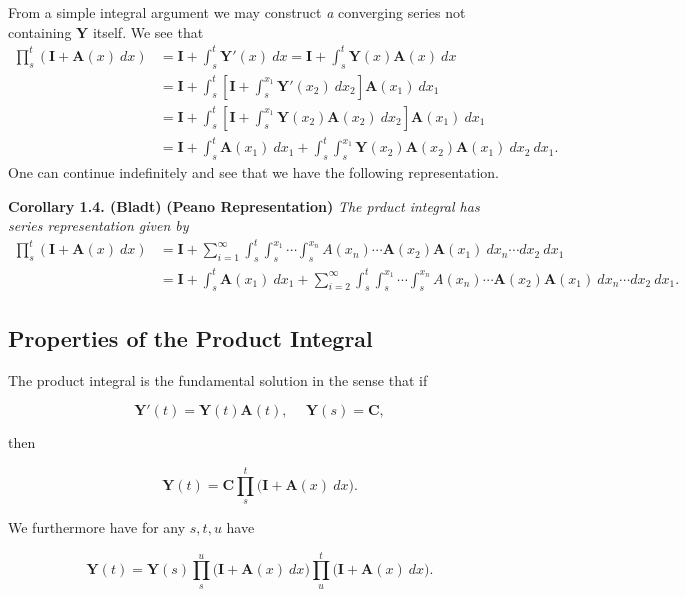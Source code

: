 \documentclass[
]{book}
\begin{document}
From a simple integral argument we may construct \emph{a} converging series not containing \(\mathbf{Y}\) itself. We see that
\begin{align*}
\prod_{s}^t(\mathbf{I}+\mathbf{A}(x)\ dx)&=\mathbf{I}+\int_s^t\mathbf{Y}'(x)\ dx=\mathbf{I}+\int_s^t\mathbf{Y}(x)\mathbf{A}(x)\ dx\\
&=\mathbf{I}+\int_s^t\left[ \mathbf{I}+\int_s^{x_1}\mathbf{Y}'(x_2)\ dx_2\right]\mathbf{A}(x_1)\ dx_1\\
&=\mathbf{I}+\int_s^t\left[ \mathbf{I}+\int_s^{x_1}\mathbf{Y}(x_2)\mathbf{A}(x_2)\ dx_2\right]\mathbf{A}(x_1)\ dx_1\\
&=\mathbf{I}+\int_s^t\mathbf{A}(x_1)\ dx_1+\int_s^t\int_s^{x_1}\mathbf{Y}(x_2)\mathbf{A}(x_2)\mathbf{A}(x_1)\ dx_2\ dx_1.
\end{align*}
One can continue indefinitely and see that we have the following representation.

\textbf{Corollary 1.4. (Bladt)} \textbf{(Peano Representation)} \emph{The prduct integral has series representation given by}
\begin{align*}
\prod_{s}^t(\mathbf{I}+\mathbf{A}(x)\ dx)&=\mathbf{I}+\sum_{i=1}^\infty\int_s^t\int_s^{x_1}\cdots\int_s^{x_n}A(x_n)\cdots\mathbf{A}(x_2)\mathbf{A}(x_1)\ dx_n\cdots dx_2\ dx_1\\
&=\mathbf{I}+\int_s^t\mathbf{A}(x_1)\ dx_1+\sum_{i=2}^\infty\int_s^t\int_s^{x_1}\cdots\int_s^{x_n}A(x_n)\cdots\mathbf{A}(x_2)\mathbf{A}(x_1)\ dx_n\cdots dx_2\ dx_1.
\end{align*}

\hypertarget{properties-of-the-product-integral}{%
\subsection{Properties of the Product Integral}\label{properties-of-the-product-integral}}

The product integral is the fundamental solution in the sense that if

\[
\mathbf{Y}'(t)=\mathbf{Y}(t)\mathbf{A}(t),\hspace{15pt}\mathbf{Y}(s)=\mathbf{C},
\]

then

\[
\mathbf{Y}(t)=\mathbf{C}\prod_{s}^t\big(\mathbf{I}+\mathbf{A}(x)\ dx\big).
\]

We furthermore have for any \(s,t,u\) have

\[
\mathbf{Y}(t)=\mathbf{Y}(s)\prod_{s}^u\big(\mathbf{I}+\mathbf{A}(x)\ dx\big)\prod_{u}^t\big(\mathbf{I}+\mathbf{A}(x)\ dx\big).
\]
\end{document}
